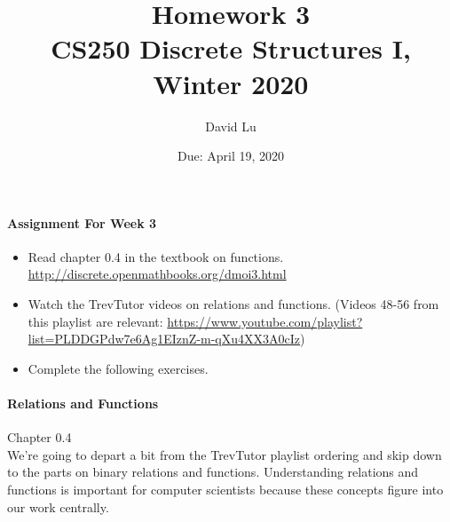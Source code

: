 \documentclass[11pt]{article} %
\title{\bf Homework 3\\[1ex]
\rm\normalsize CS250 Discrete Structures I, Winter 2020 }
\date{\normalsize Due: April 19, 2020}
\author{\normalsize David Lu}
\begin{document}

	\vspace{-4cm}\maketitle %
	
	\begin{center}
	\end{center}
	
	\paragraph{Assignment For Week 3}
	
	\begin{itemize}
		\item Read chapter 0.4 in the textbook on functions. \href{http://discrete.openmathbooks.org/dmoi3.html}{http://discrete.openmathbooks.org/dmoi3.html}
		\item Watch the TrevTutor videos on relations and functions. (Videos 48-56 from this playlist are relevant: \url{https://www.youtube.com/playlist?list=PLDDGPdw7e6Ag1EIznZ-m-qXu4XX3A0cIz})
		\item Complete the following exercises.
	\end{itemize}

	\paragraph{Relations and Functions} Chapter 0.4 \\
	
	We're going to depart a bit from the TrevTutor playlist ordering and skip down to the parts on binary relations and functions. Understanding relations and functions is important for computer scientists because these concepts figure into our work centrally. \\
	
\end{document}
